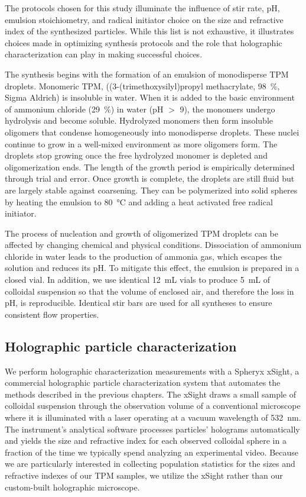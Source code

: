 The protocols chosen for this study illuminate the influence of stir rate, pH,
emulsion stoichiometry, and radical initiator choice on the size and refractive index
of the synthesized particles. While this list is not exhaustive,
it illustrates choices made in optimizing synthesis protocols and the role
that holographic characterization can play in making successful choices.

The synthesis begins with the formation of an emulsion of monodisperse TPM droplets.
Monomeric TPM, ((3-(trimethoxysilyl)propyl methacrylate, \SI{98}{\percent}, Sigma Aldrich)
is insoluble in water. When it is added to the basic environment
of ammonium chloride (\SI{29}{\percent}) in water (pH $>$ \num{9}),
the monomers undergo hydrolysis and become soluble. 
Hydrolyzed monomers then form insoluble 
oligomers that condense homogeneously into monodisperse droplets.
These nuclei continue to grow in a well-mixed environment as more oligomers form.
The droplets stop growing once the free hydrolyzed monomer is depleted and
oligomerization ends. The length of the growth period is empirically determined
through trial and error. Once growth is complete, the droplets are still fluid
but are largely stable against coarsening. They can be polymerized into
solid spheres by heating the emulsion to \SI{80}{\degreeCelsius}
and adding a heat activated free radical initiator.

The process of nucleation and growth of oligomerized TPM droplets can be
affected by changing chemical and physical conditions.
Dissociation of ammonium chloride in water leads to the production of ammonia
gas, which escapes the solution and reduces its pH.
To mitigate this effect, the emulsion is prepared in a closed vial.
In addition,
we use identical \SI{12}{\milli\liter} vials to produce \SI{5}{\milli\liter}
of colloidal suspension so that the volume of enclosed air, and therefore
the loss in pH, is reproducible. Identical stir bars are
used for all syntheses to ensure consistent flow properties.

\subsection{Holographic particle characterization}

We perform holographic characterization measurements with a Spheryx xSight,
a commercial holographic particle characterization system
that automates the methods described in the previous chapters.
The xSight draws a small sample of colloidal suspension through the
observation volume of a conventional microscope where it is illuminated
with a laser operating at a vacuum wavelength of \SI{532}{\nm}.
The instrument's analytical software processes particles' holograms automatically
and yields the size and refractive index for each observed colloidal sphere
in a fraction of the time we typically spend analyzing an experimental video.
Because we are particularly interested in collecting population statistics for the sizes
and refractive
indexes of our TPM samples, we utilize the xSight rather than our custom-built holographic
microscope.

